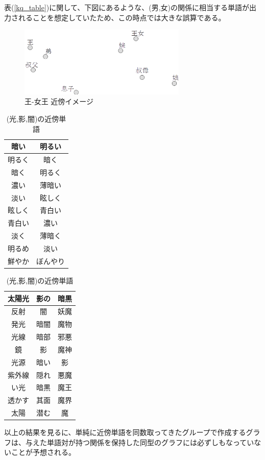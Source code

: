 表(\ref{kq_table})に関して、下図にあるような、(男,女)の関係に相当する単語が出力されることを想定していたため、この時点では大きな誤算である。
\begin{figure}[h]
  \centering
  \includegraphics[width=8cm]{../images/kq_fv.eps}
  \caption{王-女王 近傍イメージ}
  \label{kq_fv}
\end{figure}

\begin{table}[h]
  \begin{minipage}[t]{.33\textwidth}
    \caption[(明るい,暗い)]{(明るい,暗い)の近傍単語}
    \begin{center}
      \begin{tabular}{|c|c|} \hline
        暗い & 明るい \\ \hline
        明るく & 暗く \\
        暗く & 明るく \\
        濃い & 薄暗い \\
        淡い & 眩しく \\
        眩しく & 青白い \\
        青白い & 濃い \\
        淡く & 薄暗く \\
        明るめ & 淡い \\
        鮮やか & ぼんやり \\ \hline
      \end{tabular}
    \end{center}
  \end{minipage}
  \begin{minipage}[t]{.66\textwidth}
    \caption[(光,影,闇)]{(光,影,闇)の近傍単語}
    \begin{center}
      \begin{tabular}{|c|c|c|} \hline
        太陽光 & 影の & 暗黒 \\ \hline
        反射 & 闇 & 妖魔 \\
        発光 & 暗闇 & 魔物 \\
        光線 & 暗部 & 邪悪 \\
        鏡 & 影 & 魔神 \\
        光源 & 暗い & 影 \\
        紫外線 & 隠れ & 悪魔 \\
        い光 & 暗黒 & 魔王 \\
        透かす & 其面 & 魔界 \\
        太陽 & 潜む & 魔 \\ \hline
      \end{tabular}
    \end{center}
  \end{minipage}
\end{table}
以上の結果を見るに、単純に近傍単語を同数取ってきたグループで作成するグラフは、与えた単語対が持つ関係を保持した同型のグラフには必ずしもなっていないことが予想される。
